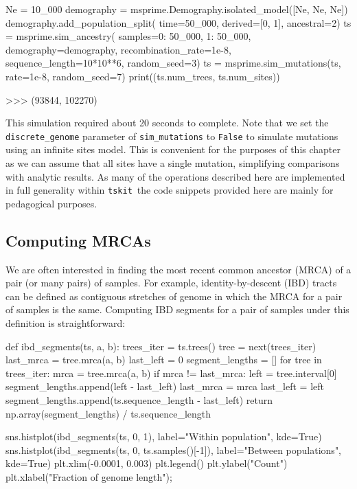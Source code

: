 \documentclass[graybox]{svmult}
\newcommand{\tskit}[0]{\texttt{tskit}}
\begin{document}
\begin{pythoncode}
Ne = 10_000
demography = msprime.Demography.isolated_model([Ne, Ne, Ne])
demography.add_population_split(
    time=50_000, derived=[0, 1], ancestral=2)
ts = msprime.sim_ancestry(
    samples={0: 50_000, 1: 50_000},
    demography=demography, recombination_rate=1e-8,
    sequence_length=10*10**6, random_seed=3)
ts = msprime.sim_mutations(ts, rate=1e-8, random_seed=7)
print((ts.num_trees, ts.num_sites))

>>> (93844, 102270)
\end{pythoncode}

This simulation required about 20 seconds to complete. Note that we set the
\texttt{discrete\_genome} parameter of \texttt{sim\_mutations} to
\texttt{False} to simulate mutations using an infinite sites model.
This is convenient for the purposes of this chapter as we can assume
that all sites have a single mutation, simplifying comparisons with analytic results. As many
of the operations described here are implemented in full generality
within \tskit\, the code snippets provided here are mainly for pedagogical
purposes.

\subsection{Computing MRCAs}\label{computing-mrcas}
We are often interested in finding the most recent common ancestor (MRCA)
of a pair (or many pairs) of samples. For example, identity-by-descent
(IBD) tracts can be defined as contiguous stretches of genome in which the
MRCA for a pair of samples is the same. Computing IBD segments for a
pair of samples under this definition is straightforward:

\begin{pythoncode}
def ibd_segments(ts, a, b):
    trees_iter = ts.trees()
    tree = next(trees_iter)
    last_mrca = tree.mrca(a, b)
    last_left = 0
    segment_lengths = []
    for tree in trees_iter:
        mrca = tree.mrca(a, b)
        if mrca != last_mrca:
            left = tree.interval[0]
            segment_lengths.append(left - last_left)
            last_mrca = mrca
            last_left = left
    segment_lengths.append(ts.sequence_length - last_left)
    return np.array(segment_lengths) / ts.sequence_length

sns.histplot(ibd_segments(ts, 0, 1),
    label="Within population", kde=True)
sns.histplot(ibd_segments(ts, 0, ts.samples()[-1]),
    label="Between populations", kde=True)
plt.xlim(-0.0001, 0.003)
plt.legend()
plt.ylabel("Count")
plt.xlabel("Fraction of genome length");
\end{pythoncode}
\end{document}
